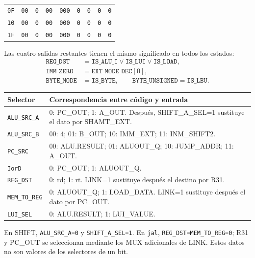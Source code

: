 \documentclass[11pt,a4paper]{article}
\newcommand{\sig}[1]{\texttt{#1}}
\begin{document}
\begin{center}
\begin{tabular}{@{}lcccccccc@{}}
\texttt{0F} & \texttt{00} & \texttt{0} & \texttt{00} & \texttt{000} & \texttt{0} & \texttt{0} & \texttt{0} & \texttt{0} \\
\texttt{10} & \texttt{00} & \texttt{0} & \texttt{00} & \texttt{000} & \texttt{0} & \texttt{0} & \texttt{0} & \texttt{0} \\
\texttt{1F} & \texttt{00} & \texttt{0} & \texttt{00} & \texttt{000} & \texttt{0} & \texttt{0} & \texttt{0} & \texttt{0} \\
\bottomrule
\end{tabular}
\label{tab:selectores}
\end{center}

Las cuatro salidas restantes tienen el mismo significado en todos los estados:
\begin{align*}
\sig{REG\_DST}&=\sig{IS\_ALU\_I}\lor\sig{IS\_LUI}\lor\sig{IS\_LOAD},\\
\sig{IMM\_ZERO}&=\sig{EXT\_MODE\_DEC}[0],\\
\sig{BYTE\_MODE}&=\sig{IS\_BYTE},\qquad
\sig{BYTE\_UNSIGNED}=\sig{IS\_LBU}.
\end{align*}

\begin{center}
\small\setlength{\tabcolsep}{5pt}
\begin{tabularx}{\linewidth}{@{}l X@{}}
\toprule
Selector & Correspondencia entre código y entrada \\
\midrule
\sig{ALU\_SRC\_A} & 0: PC\_OUT; 1: A\_OUT. Después, SHIFT\_A\_SEL=1 sustituye el dato por SHAMT\_EXT. \\
\sig{ALU\_SRC\_B} & 00: 4; 01: B\_OUT; 10: IMM\_EXT; 11: INM\_SHIFT2. \\
\sig{PC\_SRC} & 00: ALU.RESULT; 01: ALUOUT\_Q; 10: JUMP\_ADDR; 11: A\_OUT. \\
\sig{IorD} & 0: PC\_OUT; 1: ALUOUT\_Q. \\
\sig{REG\_DST} & 0: rd; 1: rt. LINK=1 sustituye después el destino por R31. \\
\sig{MEM\_TO\_REG} & 0: ALUOUT\_Q; 1: LOAD\_DATA. LINK=1 sustituye después el dato por PC\_OUT. \\
\sig{LUI\_SEL} & 0: ALU.RESULT; 1: LUI\_VALUE. \\
\bottomrule
\end{tabularx}
\end{center}

En SHIFT, \sig{ALU\_SRC\_A=0} y \sig{SHIFT\_A\_SEL=1}. En \sig{jal},
\sig{REG\_DST=MEM\_TO\_REG=0}; R31 y PC\_OUT se seleccionan mediante
los MUX adicionales de LINK. Estos datos no son valores de los selectores
de un bit.
\end{document}
